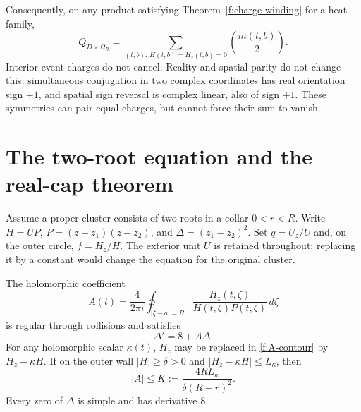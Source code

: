 Consequently, on any product satisfying Theorem~\ref{f:charge-winding}
for a heat family,
\begin{equation}\label{f:positive-sum}
 Q_{D\times\Omega_R}
    =\sum_{(t,b):\,H(t,b)=H_z(t,b)=0}\binom{m(t,b)}2.
\end{equation}
Interior event charges do not cancel.  Reality and spatial parity do
not change this: simultaneous conjugation in two complex coordinates
has real orientation sign $+1$, and spatial sign reversal is complex
linear, also of sign $+1$.  These symmetries can pair equal charges,
but cannot force their sum to vanish.

\section{The two-root equation and the real-cap theorem}
\label{f:two-root-section}

Assume a proper cluster consists of two roots in a collar
$0<r<R$.  Write $H=UP$, $P=(z-z_1)(z-z_2)$, and
$\Delta=(z_1-z_2)^2$.  Set $q=U_z/U$ and, on the outer circle,
$f=H_z/H$.  The exterior unit $U$ is retained throughout; replacing
it by a constant would change the equation for the original cluster.

\begin{proposition}\label{f:affine}
The holomorphic coefficient
\begin{equation}\label{f:A-contour}
 A(t)=\frac4{2\pi i}\oint_{|\zeta-a|=R}
        \frac{H_z(t,\zeta)}{H(t,\zeta)P(t,\zeta)}\,d\zeta
\end{equation}
is regular through collisions and satisfies
\begin{equation}\label{f:affine-equation}
                    \Delta'=8+A\Delta.
\end{equation}
For any holomorphic scalar $\kappa(t)$, $H_z$ may be replaced in
\eqref{f:A-contour} by $H_z-\kappa H$.  If on the outer wall
$|H|\ge\delta>0$ and $|H_z-\kappa H|\le L_\kappa$, then
\begin{equation}\label{f:A-bound}
          |A|\le K:=\frac{4RL_\kappa}{\delta(R-r)^2}.
\end{equation}
Every zero of $\Delta$ is simple and has derivative $8$.
\end{proposition}

